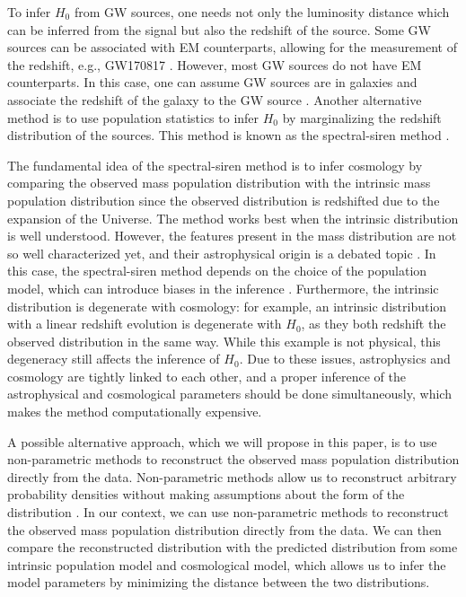\documentclass[sn-aps, pdflatex]{sn-jnl}
\begin{document}
To infer $H_0$ from \ac{GW} sources, one needs not only the luminosity distance which can be inferred from the signal but also the redshift of the source.
Some \ac{GW} sources can be associated with \ac{EM} counterparts, allowing for the measurement of the redshift, e.g., GW170817 \citep{LIGOScientific:2017adf, Guidorzi:2017ogy}.
However, most \ac{GW} sources do not have \ac{EM} counterparts.
In this case, one can assume \ac{GW} sources are in galaxies and associate the redshift of the galaxy to the \ac{GW} source \citep{Schutz:1986gp, DelPozzo:2011vcw, Gray:2019ksv, Gray:2023wgj}.
Another alternative method is to use population statistics to infer $H_0$ by marginalizing the redshift distribution of the sources.
This method is known as the spectral-siren method \citep{You:2020wju, Mastrogiovanni:2021wsd, LIGOScientific:2021aug, Ezquiaga:2022zkx}.

The fundamental idea of the spectral-siren method is to infer cosmology by comparing the observed mass population distribution with the intrinsic mass population distribution since the observed distribution is redshifted due to the expansion of the Universe.
The method works best when the intrinsic distribution is well understood.
However, the features present in the mass distribution are not so well characterized yet, and their astrophysical origin is a debated topic \citep{Mapelli:2020vfa, Mandel:2018hfr}.
In this case, the spectral-siren method depends on the choice of the population model, which can introduce biases in the inference \citep{Mastrogiovanni:2021wsd, Pierra:2023deu}.
Furthermore, the intrinsic distribution is degenerate with cosmology: for example, an intrinsic distribution with a linear redshift evolution is degenerate with $H_0$, as they both redshift the observed distribution in the same way.
While this example is not physical, this degeneracy still affects the inference of $H_0$.
Due to these issues, astrophysics and cosmology are tightly linked to each other, and a proper inference of the astrophysical and cosmological parameters should be done simultaneously, which makes the method computationally expensive.

A possible alternative approach, which we will propose in this paper, is to use non-parametric methods to reconstruct the observed mass population distribution directly from the data.
Non-parametric methods allow us to reconstruct arbitrary probability densities without making assumptions about the form of the distribution \citep{Rinaldi:2021bhm}.
In our context, we can use non-parametric methods to reconstruct the observed mass population distribution directly from the data.
We can then compare the reconstructed distribution with the predicted distribution from some intrinsic population model and cosmological model, which allows us to infer the model parameters by minimizing the distance between the two distributions.
\end{document}
